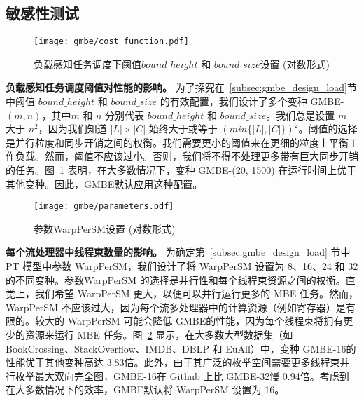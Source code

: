 \subsection{敏感性测试}
\label{subsec:gmbe_sensitivity}


\begin{figure} [H]
	\centering
  \vspace{0.1in}
	\texttt{[image: gmbe/cost\_function.pdf]}	
	\vspace{0.1in}
  \caption{负载感知任务调度下阈值$bound\_height$ 和 $bound\_size$设置 (对数形式)}
	\label{fig:gmbe_exp_cost}
\end{figure}


\textbf{负载感知任务调度阈值对性能的影响。} 为了探究在~\ref{subsec:gmbe_design_load}节中阈值 $bound\_height$ 和 $bound\_size$ 的有效配置，我们设计了多个变种 GMBE-$(m, n)$，其中$m$ 和 $n$ 分别代表 $bound\_height$ 和 $bound\_size$。我们总是设置 $m$ 大于 $n^2$，因为我们知道  $|L|\times|C|$ 始终大于或等于 $(min\{|L|,|C|\})^2$。阈值的选择是并行粒度和同步开销之间的权衡。我们需要更小的阈值来在更细的粒度上平衡工作负载。然而，阈值不应该过小。否则，我们将不得不处理更多带有巨大同步开销的任务。图~\ref{fig:gmbe_exp_cost} 表明，在大多数情况下，变种 GMBE-(20, 1500) 在运行时间上优于其他变种。因此，GMBE默认应用这种配置。


\begin{figure} [H]
	\centering
  \vspace{0.1in}
	\texttt{[image: gmbe/parameters.pdf]}	
	\vspace{0.1in}
  \caption{参数\textsf{WarpPerSM}设置 (对数形式)}
	\label{fig:gmbe_exp_config}
\end{figure}

\textbf{每个流处理器中线程束数量的影响。} 为确定第~\ref{subsec:gmbe_design_load} 节中 PT 模型中参数 \textsf{WarpPerSM}，我们设计了将 \textsf{WarpPerSM} 设置为 8、16、24 和 32 的不同变种。参数\textsf{WarpPerSM} 的选择是并行性和每个线程束资源之间的权衡。直觉上，我们希望 \textsf{WarpPerSM} 更大，以便可以并行运行更多的 MBE 任务。然而，\textsf{WarpPerSM} 不应该过大，因为每个流多处理器中的计算资源（例如寄存器）是有限的。较大的 \textsf{WarpPerSM} 可能会降低 GMBE的性能，因为每个线程束将拥有更少的资源来运行 MBE 任务。图~\ref{fig:gmbe_exp_config} 显示，在大多数大型数据集（如 BookCrossing、StackOverflow、IMDB、DBLP 和 EuAll）中，变种 GMBE-16的性能优于其他变种高达 3.83倍。此外，由于其广泛的枚举空间需要更多线程束并行枚举最大双向完全图，GMBE-16在 Github 上比 GMBE-32慢 0.94倍。考虑到在大多数情况下的效率，GMBE默认将 \textsf{WarpPerSM} 设置为 16。

